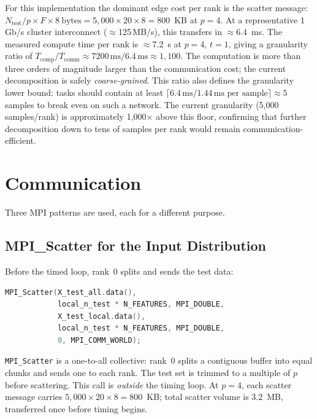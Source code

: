 \documentclass[12pt,a4paper]{article}
\begin{document}
For this implementation the dominant edge cost per rank is the scatter message:
$N_\text{test}/p \times F \times 8~\text{bytes}
 = 5{,}000 \times 20 \times 8 = 800$~KB at $p=4$.
At a representative 1\,Gb/s cluster interconnect ($\approx$125\,MB/s), this
transfers in $\approx$6.4~ms. The measured compute time per rank is
$\approx$7.2~s at $p=4$, $t=1$, giving a granularity ratio of
$T_\text{comp}/T_\text{comm} \approx 7200\,\text{ms}/6.4\,\text{ms}
\approx 1{,}100$.
The computation is more than three orders of magnitude larger than the
communication cost; the current decomposition is safely \emph{coarse-grained}.
This ratio also defines the granularity lower bound: tasks should contain at
least $\lceil 6.4\,\text{ms} / 1.44\,\text{ms per sample} \rceil \approx 5$
samples to break even on such a network.
The current granularity (5{,}000 samples/rank) is approximately 1{,}000$\times$
above this floor, confirming that further decomposition down to tens of samples
per rank would remain communication-efficient.

\section{Communication}
\label{sec:communication}

Three MPI patterns are used, each for a different purpose.

\subsection{MPI\_Scatter for the Input Distribution}

Before the timed loop, rank~0 splits and sends the test data:

\begin{lstlisting}[language=C++]
MPI_Scatter(X_test_all.data(),
            local_n_test * N_FEATURES, MPI_DOUBLE,
            X_test_local.data(),
            local_n_test * N_FEATURES, MPI_DOUBLE,
            0, MPI_COMM_WORLD);
\end{lstlisting}

\texttt{MPI\_Scatter} is a one-to-all collective: rank~0 splits a contiguous
buffer into equal chunks and sends one to each rank. The test set is trimmed
to a multiple of $p$ before scattering. This call is \emph{outside} the
timing loop. At $p=4$, each scatter message carries
$5{,}000 \times 20 \times 8 = 800$~KB; total scatter volume is 3.2~MB,
transferred once before timing begins.
\end{document}
